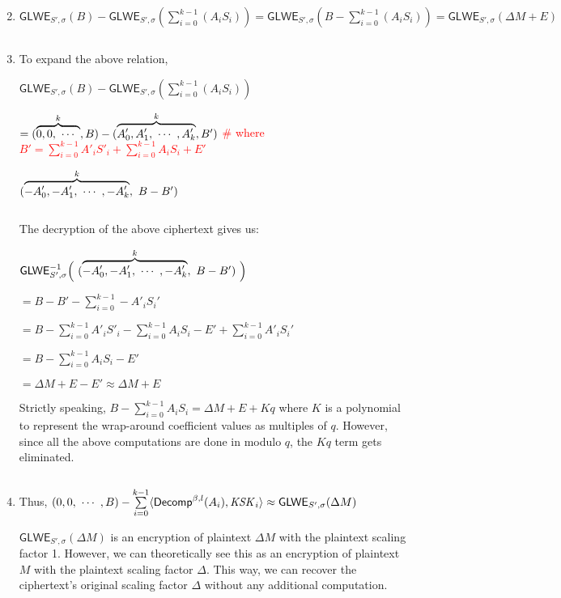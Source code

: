 \begin{myproof}
\begin{enumerate}
$ $
 
 \item $\textsf{GLWE}_{S', \sigma}(B) - \textsf{GLWE}_{S', \sigma} \left( \sum \limits_{i=0}^{k-1} (A_i  S_i )\right) = \textsf{GLWE}_{S', \sigma}(B - \sum \limits_{i=0}^{k-1} (A_i  S_i )) = \textsf{GLWE}_{S', \sigma}(\Delta M + E)$

$ $

\item To expand the above relation, 

$\textsf{GLWE}_{S', \sigma}(B) - \textsf{GLWE}_{S', \sigma} \left(\sum \limits_{i=0}^{k-1} (A_i  S_i)\right)$

$ = (\overbrace{0, 0, \text{ } \text{$\cdots$} \text{ }}^k, B) - (\overbrace{A'_0, A'_1, \text{ } \text{$\cdots$} \text{ }, A'_k}^k, B')  $ \text { } \textcolor{red}{ \# where $B' = \sum\limits_{i=0}^{k-1} A'_iS'_i + \sum\limits_{i=0}^{k-1} A_iS_i + E'$}

$(\overbrace{-A'_0, -A'_1, \text{ } \text{$\cdots$} \text{ }, -A'_k}^k, \text{ } B - B')$

$ $

The decryption of the above ciphertext gives us:

$ \textsf{GLWE}_{S', \sigma}^{-1} \bm{\Big(} \text{ } (\overbrace{-A'_0, -A'_1, \text{ } \text{$\cdots$} \text{ }, -A'_k}^k, \text{ } B - B') \text{ } \bm{\Big)}$

$ = B -  B' - \sum\limits_{i=0}^{k-1} -A'_iS_i'$

$= B - \sum\limits_{i=0}^{k-1} A'_iS'_i - \sum\limits_{i=0}^{k-1} A_iS_i - E' + \sum\limits_{i=0}^{k-1} A'_iS_i'$

$= B - \sum\limits_{i=0}^{k-1} A_iS_i - E'$

$= \Delta M + E - E' \approx \Delta M + E$

Strictly speaking, $B - \sum\limits_{i=0}^{k-1} A_iS_i = \Delta M + E + Kq$ where $K$ is a polynomial to represent the wrap-around coefficient values as multiples of $q$. However, since all the above computations are done in modulo $q$, the $Kq$ term gets eliminated. 

$ $

\item Thus, $ (0, 0, \text{ } \text{$\cdots$} \text{ } , B) - \sum \limits_{i=0}^{k-1} \langle \textsf{Decomp}^{\beta, l}(A_i), \mathit{KSK}_i \rangle \approx \textsf{GLWE}_{S',\sigma}(\Delta M) $ 

$\textsf{GLWE}_{S',\sigma}(\Delta M)$ is an encryption of plaintext $\Delta M$ with the plaintext scaling factor 1. However, we can theoretically see this as an encryption of plaintext $M$ with the plaintext scaling factor $\Delta$. This way, we can recover the ciphertext's original scaling factor $\Delta$ without any additional computation. 
\end{enumerate}
\end{myproof}
